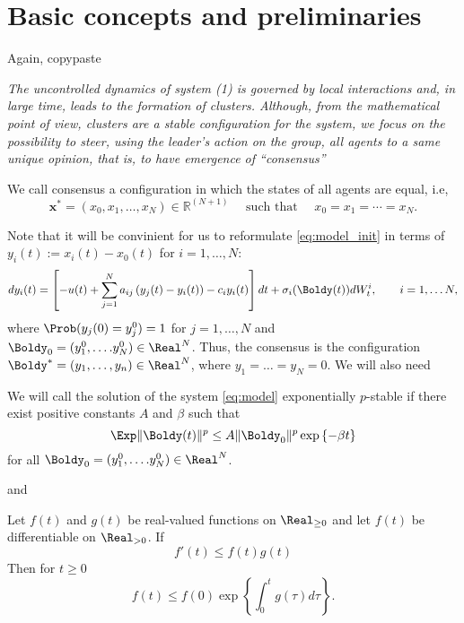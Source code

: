 \section{Basic concepts and preliminaries} 

Again, copypaste

\textit{
The uncontrolled dynamics of system (1) is governed by local interactions and, in large time, leads to the
formation of clusters. Although, from the mathematical point of view, clusters are a stable configuration for
the system, we focus on the possibility to steer, using the leader’s action on the group, all agents to a same
unique opinion, that is, to have emergence of “consensus”
}

\begin{definition}
We call consensus a configuration in which the states of all agents are equal, i.e,
$$
\mathbf{x}^*=\left(x_0, x_1, \ldots, x_N\right) \in \mathbb{R}^{(N+1)} \quad \text { such that } \quad x_0=x_1=\cdots=x_N .
$$
\end{definition}

Note that it will be convinient for us to reformulate \eqref{eq:model_init} in terms of $y_i(t) := x_i(t) - x_0(t)$ for $i = 1, \ldots, N$:
\begin{equation}\label{eq:model}
    dy_i(t) = \left[-u(t) + \sum_{j=1}^N a_{i j}\left(y_j(t)-y_i(t)\right)-c_i y_i(t)\right] dt + \sigma_i(\Boldy(t)) dW^i_t, \qquad  i = 1, \ldots N,
\end{equation}
where $\Prob(y_j(0) = y_j^0) = 1$ for $j = 1, \ldots, N$ and $\Boldy_0 = (y_1^0, \ldots. y_N^0) \in \Real^N$. 
Thus, the consensus is the configuration $\Boldy^* = (y_1, \ldots, y_n) \in \Real^N$, where $y_1 = \ldots = y_N  = 0$. We will also need
\begin{definition}
    We will call the solution of the system \eqref{eq:model} exponentially $p$-stable if there exist positive constants $A$ and $\beta$ such that
    \[
       \Exp \|\Boldy(t)\|^p \leq A  \|\Boldy_0\|^p \exp\left\{-\beta t\right\}
    \]
    for all $\Boldy_0 = (y_1^0, \ldots. y_N^0) \in \Real^N$.
\end{definition}
and 
\begin{lemma}\label{lemma:gronwall-bellman}
Let $f(t)$ and $g(t)$ be real-valued functions on $\Real_{\geq0}$ and let $f(t)$ be differentiable on $\Real_{>0}$. If
\[ 
f'(t) \leq f(t) g(t) 
\]
Then for $t \geq 0$
$$
f(t) \leq f(0) \exp \left\{\int_0^t g\left(\tau\right) d \tau\right\} .
$$
\end{lemma}

